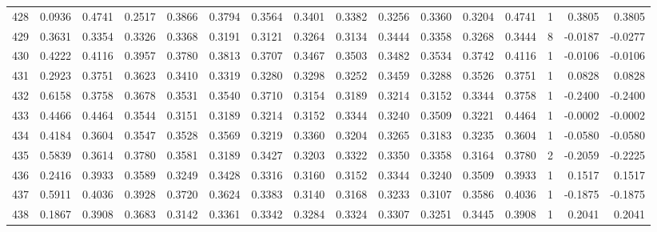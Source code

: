 \begin{tabular}{lrrrrrrrrrrrrrrr}
428 &      0.0936 &  0.4741 &  0.2517 &  0.3866 &  0.3794 &  0.3564 &  0.3401 &  0.3382 &  0.3256 &  0.3360 &   0.3204 &     0.4741 &      1 &                    0.3805 &                     0.3805 \\
429 &      0.3631 &  0.3354 &  0.3326 &  0.3368 &  0.3191 &  0.3121 &  0.3264 &  0.3134 &  0.3444 &  0.3358 &   0.3268 &     0.3444 &      8 &                   -0.0187 &                    -0.0277 \\
430 &      0.4222 &  0.4116 &  0.3957 &  0.3780 &  0.3813 &  0.3707 &  0.3467 &  0.3503 &  0.3482 &  0.3534 &   0.3742 &     0.4116 &      1 &                   -0.0106 &                    -0.0106 \\
431 &      0.2923 &  0.3751 &  0.3623 &  0.3410 &  0.3319 &  0.3280 &  0.3298 &  0.3252 &  0.3459 &  0.3288 &   0.3526 &     0.3751 &      1 &                    0.0828 &                     0.0828 \\
432 &      0.6158 &  0.3758 &  0.3678 &  0.3531 &  0.3540 &  0.3710 &  0.3154 &  0.3189 &  0.3214 &  0.3152 &   0.3344 &     0.3758 &      1 &                   -0.2400 &                    -0.2400 \\
433 &      0.4466 &  0.4464 &  0.3544 &  0.3151 &  0.3189 &  0.3214 &  0.3152 &  0.3344 &  0.3240 &  0.3509 &   0.3221 &     0.4464 &      1 &                   -0.0002 &                    -0.0002 \\
434 &      0.4184 &  0.3604 &  0.3547 &  0.3528 &  0.3569 &  0.3219 &  0.3360 &  0.3204 &  0.3265 &  0.3183 &   0.3235 &     0.3604 &      1 &                   -0.0580 &                    -0.0580 \\
435 &      0.5839 &  0.3614 &  0.3780 &  0.3581 &  0.3189 &  0.3427 &  0.3203 &  0.3322 &  0.3350 &  0.3358 &   0.3164 &     0.3780 &      2 &                   -0.2059 &                    -0.2225 \\
436 &      0.2416 &  0.3933 &  0.3589 &  0.3249 &  0.3428 &  0.3316 &  0.3160 &  0.3152 &  0.3344 &  0.3240 &   0.3509 &     0.3933 &      1 &                    0.1517 &                     0.1517 \\
437 &      0.5911 &  0.4036 &  0.3928 &  0.3720 &  0.3624 &  0.3383 &  0.3140 &  0.3168 &  0.3233 &  0.3107 &   0.3586 &     0.4036 &      1 &                   -0.1875 &                    -0.1875 \\
438 &      0.1867 &  0.3908 &  0.3683 &  0.3142 &  0.3361 &  0.3342 &  0.3284 &  0.3324 &  0.3307 &  0.3251 &   0.3445 &     0.3908 &      1 &                    0.2041 &                     0.2041 \\

\end{tabular}
